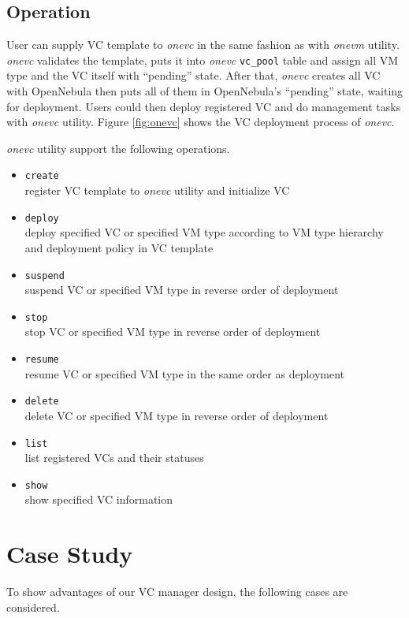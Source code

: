 \documentclass[conference]{IEEEtran}
\begin{document}
\subsection{Operation}
User can supply VC template to \emph{onevc} in the same fashion as with \emph{onevm} utility.
\emph{onevc} validates the template, puts it into \emph{onevc} \texttt{vc\_pool} table and assign all VM type and the VC itself with ``pending'' state.
After that, \emph{onevc} creates all VC with OpenNebula then puts all of them in OpenNebula's ``pending'' state, waiting for deployment.
Users could then deploy registered VC and do management tasks with \emph{onevc} utility.
Figure \ref{fig:onevc} shows the VC deployment process of \emph{onevc}.

\emph{onevc} utility support the following operations.

\begin{itemize}
\item \texttt{create}\\ register VC template to \emph{onevc} utility and initialize VC
\item \texttt{deploy}\\ deploy specified VC or specified VM type according to VM type hierarchy and deployment policy in VC template 
\item \texttt{suspend}\\ suspend VC or specified VM type in reverse order of deployment
\item \texttt{stop}\\ stop VC or specified VM type in reverse order of deployment
\item \texttt{resume}\\ resume VC or specified VM type in the same order as deployment
\item \texttt{delete}\\ delete VC or specified VM type in reverse order of deployment
\item \texttt{list}\\ list registered VCs and their statuses
\item \texttt{show}\\ show specified VC information
\end{itemize}

\section{Case Study}
To show advantages of our VC manager design, the following cases are considered.
 
\end{document}
